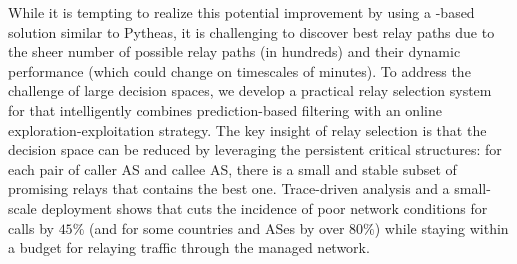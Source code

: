 While it is tempting to realize this potential improvement by using a \ddn-based
solution similar to Pytheas, it is challenging to discover best relay paths due to 
the sheer number of possible relay paths (in hundreds) and their dynamic 
performance (which could change on timescales of minutes).
To address the challenge of large decision spaces, we develop a practical relay 
selection system for \hybrid that intelligently combines prediction-based filtering with 
an online  exploration-exploitation strategy. 
The key insight of \hybrid relay selection is that the decision space
can be reduced by leveraging the persistent critical structures: 
for each pair of caller AS and callee AS, there is a small 
and stable subset of promising relays that contains the best one.
Trace-driven analysis and a small-scale deployment 
shows that \hybrid cuts the incidence of poor network 
conditions for calls by $45\%$ (and for some countries 
and ASes by over $80\%$) while staying within a budget
for relaying traffic through the managed network.


%
%


